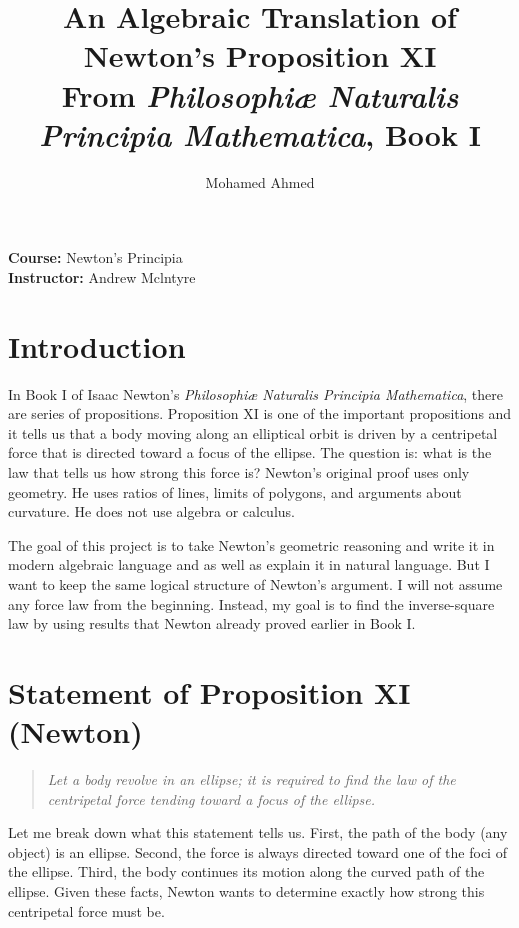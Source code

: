 \documentclass[12pt]{article}
\title{\textbf{An Algebraic Translation of Newton's Proposition XI}\\
\large From \emph{Philosophiæ Naturalis Principia Mathematica}, Book I}
\author{Mohamed Ahmed}
\date{}
\begin{document}
\maketitle

\noindent\textbf{Course:} Newton's Principia\\
\textbf{Instructor:} Andrew Mclntyre

\vspace{0.3in}

\section*{Introduction}

In Book I of Isaac Newton's \emph{Philosophiæ Naturalis Principia Mathematica}, there are series of propositions. Proposition XI is one of the important propositions and it tells us that a body moving along an elliptical orbit is driven by a centripetal force that is directed toward a focus of the ellipse. The question is: what is the law that tells us how strong this force is? Newton's original proof uses only geometry. He uses ratios of lines, limits of polygons, and arguments about curvature. He does not use algebra or calculus.

The goal of this project is to take Newton's geometric reasoning and write it in modern algebraic language and as well as explain it in natural language. But I want to keep the same logical structure of Newton's argument. I will not assume any force law from the beginning. Instead, my goal is to find the inverse-square law by using results that Newton already proved earlier in Book I.

\section*{Statement of Proposition XI (Newton)}

\begin{quote}
\emph{Let a body revolve in an ellipse; it is required to find the law of the centripetal force tending toward a focus of the ellipse.}
\end{quote}

Let me break down what this statement tells us. First, the path of the body (any object) is an ellipse. Second, the force is always directed toward one of the foci of the ellipse. Third, the body continues its motion along the curved path of the ellipse. Given these facts, Newton wants to determine exactly how strong this centripetal force must be.
\end{document}

